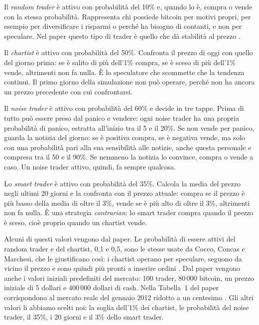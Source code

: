 Il \textit{random trader} è attivo con probabilità del 10\% e, quando lo è, compra o vende con la stessa probabilità. Rappresenta chi possiede bitcoin per motivi propri, per esempio per diversificare i risparmi o perché ha bisogno di contanti, e non per speculare. Nel paper questo tipo di trader è quello che dà stabilità al prezzo \cite{paper_riferimento}.

Il \textit{chartist} è attivo con probabilità del 50\%. Confronta il prezzo di oggi con quello del giorno prima: se è salito di più dell'1\% compra, se è sceso di più dell'1\% vende, altrimenti non fa nulla. È lo speculatore che scommette che la tendenza continui. Il primo giorno della simulazione non può operare, perché non ha ancora un prezzo precedente con cui confrontarsi.

Il \textit{noise trader} è attivo con probabilità del 60\% e decide in tre tappe. Prima di tutto può essere preso dal panico e vendere: ogni noise trader ha una propria probabilità di panico, estratta all'inizio tra il 5 e il 20\%. Se non vende per panico, guarda la notizia del giorno: se è positiva compra, se è negativa vende, ma solo con una probabilità pari alla sua sensibilità alle notizie, anche questa personale e compresa tra il 50 e il 90\%. Se nemmeno la notizia lo convince, compra o vende a caso. Un noise trader attivo, quindi, fa sempre qualcosa.

Lo \textit{smart trader} è attivo con probabilità del 35\%. Calcola la media del prezzo negli ultimi 20 giorni e la confronta con il prezzo attuale: compra se il prezzo è più basso della media di oltre il 3\%, vende se è più alto di oltre il 3\%, altrimenti non fa nulla. È una strategia \textit{contrarian}: lo smart trader compra quando il prezzo è sceso, cioè proprio quando un chartist vende.

Alcuni di questi valori vengono dal paper. Le probabilità di essere attivi del random trader e del chartist, 0,1 e 0,5, sono le stesse usate da Cocco, Concas e Marchesi, che le giustificano così: i chartist operano per speculare, seguono da vicino il prezzo e sono quindi più pronti a inserire ordini \cite{paper_riferimento}. Dal paper vengono anche i valori iniziali predefiniti del mercato: 100 trader, 80\,000 bitcoin, un prezzo iniziale di 5 dollari e 400\,000 dollari di cash. Nella Tabella~1 del paper corrispondono al mercato reale del gennaio 2012 ridotto a un centesimo \cite{paper_riferimento}. Gli altri valori li abbiamo scelti noi: la soglia dell'1\% dei chartist, le probabilità del noise trader, il 35\%, i 20 giorni e il 3\% dello smart trader.

